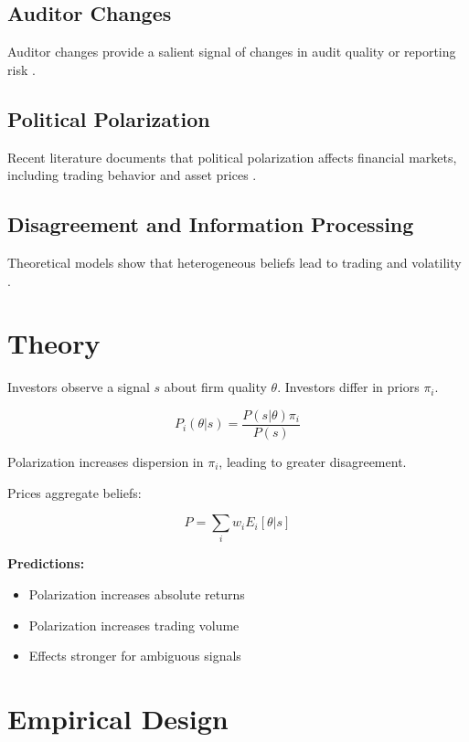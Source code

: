 \documentclass[12pt]{article}
\begin{document}
\subsection{Auditor Changes}

Auditor changes provide a salient signal of changes in audit quality or reporting risk \citep{johnson1990,defond1998,landsman2009}.

\subsection{Political Polarization}

Recent literature documents that political polarization affects financial markets, including trading behavior and asset prices \citep{kempf2024}.

\subsection{Disagreement and Information Processing}

Theoretical models show that heterogeneous beliefs lead to trading and volatility \citep{kandel1995,harris1993,hong2007}.

\section{Theory}

Investors observe a signal $s$ about firm quality $\theta$. Investors differ in priors $\pi_i$.

\begin{equation}
P_i(\theta|s) = \frac{P(s|\theta)\pi_i}{P(s)}
\end{equation}

Polarization increases dispersion in $\pi_i$, leading to greater disagreement.

Prices aggregate beliefs:

\begin{equation}
P = \sum_i w_i E_i[\theta|s]
\end{equation}

\textbf{Predictions:}
\begin{itemize}
\item Polarization increases absolute returns
\item Polarization increases trading volume
\item Effects stronger for ambiguous signals
\end{itemize}

\section{Empirical Design}
\end{document}
